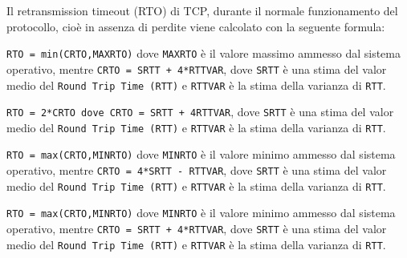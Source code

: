 \question[1]
Il retransmission timeout (RTO) di TCP, durante il normale funzionamento del protocollo, cioè in assenza di perdite viene calcolato con la seguente formula:

\begin{checkboxes}
	\choice \texttt{RTO = min(CRTO,MAXRTO)} dove \texttt{MAXRTO} è il valore massimo ammesso dal sistema operativo, mentre \texttt{CRTO = SRTT + 4*RTTVAR}, dove \texttt{SRTT} è una stima del valor medio del \texttt{Round Trip Time (RTT)} e \texttt{RTTVAR} è la stima della varianza di \texttt{RTT}.

	\choice \texttt{RTO = 2*CRTO dove CRTO = SRTT + 4RTTVAR}, dove \texttt{SRTT} è una stima del valor medio del \texttt{Round Trip Time (RTT)} e \texttt{RTTVAR} è la stima della varianza di \texttt{RTT}.

	\choice \texttt{RTO = max(CRTO,MINRTO)} dove \texttt{MINRTO} è il valore minimo ammesso dal sistema operativo, mentre \texttt{CRTO = 4*SRTT - RTTVAR}, dove \texttt{SRTT} è una stima del valor medio del \texttt{Round Trip Time (RTT)} e \texttt{RTTVAR} è la stima della varianza di \texttt{RTT}.

	\CorrectChoice \texttt{RTO = max(CRTO,MINRTO)} dove \texttt{MINRTO} è il valore minimo ammesso dal sistema operativo, mentre \texttt{CRTO = SRTT + 4*RTTVAR}, dove \texttt{SRTT} è una stima del valor medio del \texttt{Round Trip Time (RTT)} e \texttt{RTTVAR} è la stima della varianza di \texttt{RTT}.
\end{checkboxes}
